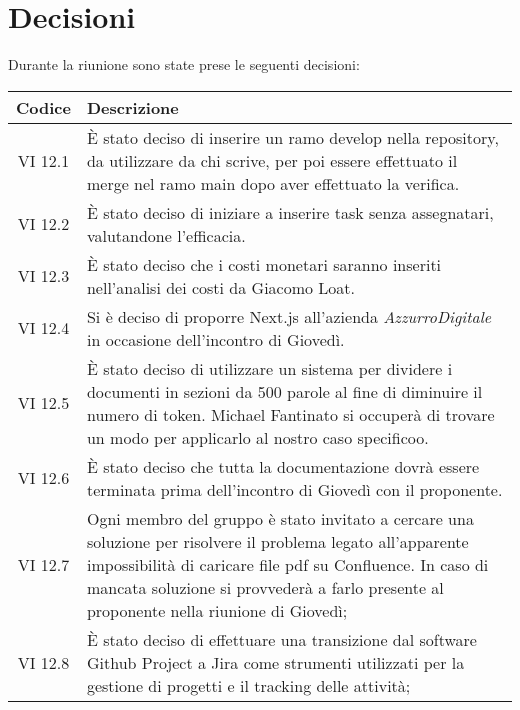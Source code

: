 
\section{Decisioni}

Durante la riunione sono state prese le seguenti decisioni:
 
\vspace{0.5cm}

\begin{table}[htbp]
    \centering
    \begin{tabular}{|c|p{}|}
        \hline
        \rowcolor[gray]{0.75}
        \textbf{Codice} & \textbf{Descrizione}\\
        \hline
        VI 12.1 & È stato deciso di inserire un ramo develop nella repository, da utilizzare da chi scrive, per poi essere effettuato il merge nel ramo main dopo aver effettuato la verifica.\\
        \hline
        VI 12.2 & È stato deciso di iniziare a inserire task senza assegnatari, valutandone l'efficacia.\\
        \hline
        VI 12.3 & È stato deciso che i costi monetari saranno inseriti nell'analisi dei costi da Giacomo Loat.\\
        \hline
        VI 12.4 & Si è deciso di proporre Next.js all'azienda \emph{AzzurroDigitale} in occasione dell'incontro di Giovedì.\\
        \hline
        VI 12.5 & È stato deciso di utilizzare un sistema per dividere i documenti in sezioni da 500 parole al fine di diminuire il numero di token. Michael Fantinato si occuperà di trovare un modo per applicarlo al nostro caso specificoo.\\
        \hline
        VI 12.6 & È stato deciso che tutta la documentazione dovrà essere terminata prima dell'incontro di Giovedì con il proponente.\\
        \hline
        VI 12.7 & Ogni membro del gruppo è stato invitato a cercare una soluzione per risolvere il problema legato all'apparente impossibilità di caricare file pdf su Confluence. In caso di mancata soluzione si provvederà a farlo presente al proponente nella riunione di Giovedì;\\
        \hline
        VI 12.8 & È stato deciso di effettuare una transizione dal software Github Project a Jira come strumenti utilizzati per la gestione di progetti e il tracking delle attività;\\

\end{tabular}
\end{table}
